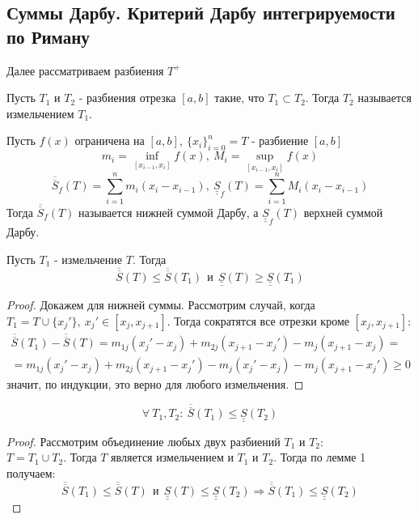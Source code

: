\subsection{Суммы Дарбу. Критерий Дарбу интегрируемости по Риману}
Далее рассматриваем разбиения $T^+$
\begin{definition}
    Пусть $T_{1}$ и $T_{2}$ - разбиения отрезка $[a,b]$ такие, что $T_1\subset T_2$. Тогда $T_2$ называется измельчением $T_1$.
\end{definition} 
\begin{definition}
    Пусть $f(x)$ ограничена на $[a,b],\ \{x_i\}_{i=0}^n=T$ - разбиение $[a,b]$
    \[m_i=\inf\limits_{[x_{i-1}, x_{i}]} f(x),\ M_i=\sup\limits_{[x_{i-1}, x_{i}]}f(x)\] 
    \[\overline{\overline{S}}_f(T)=\sum\limits_{i=1}^{n}m_i(x_{i}-x_{i-1}),\ \underline{\underline{S}}_f(T)=\sum\limits_{i=1}^{n}M_i(x_{i}-x_{i-1})\]
    Тогда $\overline{\overline{S}}_f(T)$ называется нижней суммой Дарбу, а $\underline{\underline{S}}_f(T)$ верхней суммой Дарбу.
\end{definition} 
\begin{numlemma}
    Пусть $T_1$ - измельчение $T$. Тогда
    \[\overline{\overline{S}}(T)\leq \overline{\overline{S}}(T_1)\ \ \text{и}\ \ \underline{\underline{S}}(T)\geq \underline{\underline{S}}(T_1)\]
\end{numlemma} 
\begin{proof}
    Докажем для нижней суммы. Рассмотрим случай, когда\\
    $T_1=T\cup \{x_j'\},\ x_j'\in [x_j, x_{j+1}]$. Тогда сократятся все отрезки кроме $[x_j,x_{j+1}]:$
    \begin{multline*}
        \overline{\overline{S}}(T_1)-\overline{\overline{S}}(T)=m_{1j}(x_j'-x_j)+m_{2j}(x_{j+1}-x_j')-m_j(x_{j+1}-x_j)=\\
        =m_{1j}(x_j'-x_j)+m_{2j}(x_{j+1}-x_j')-m_j(x_j'-x_j)-m_j(x_{j+1}-x_j')\geq 0
    \end{multline*}
    значит, по индукции, это верно для любого измельчения.
\end{proof} 
\begin{numlemma}
    \[\forall\ T_1, T_2:\ \overline{\overline{S}}(T_1)\leq \underline{\underline{S}}(T_2)\]
\end{numlemma} 
\begin{proof}
    Рассмотрим объединение любых двух разбиений $T_1$ и $T_2$:\\ $T=T_1\cup T_2$. Тогда $T$ является измельчением и $T_1$ и $T_2$. Тогда по лемме 1 получаем:
    \[\overline{\overline{S}}(T_1)\leq \overline{\overline{S}}(T)\ \ \text{и}\ \ \underline{\underline{S}}(T)\leq \underline{\underline{S}}(T_2) \Rightarrow \overline{\overline{S}}(T_1)\leq \underline{\underline{S}}(T_2)\]
\end{proof} 
